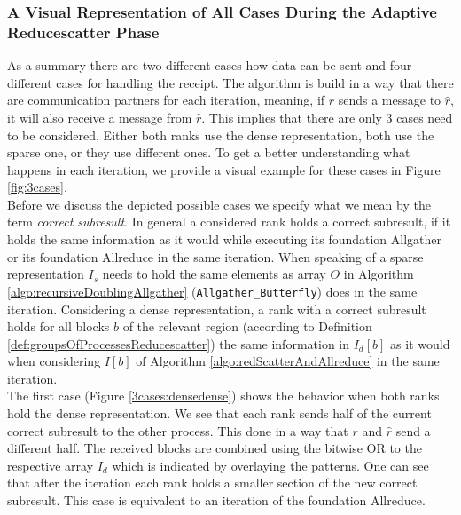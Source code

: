 \subsubsection{A Visual Representation of All Cases During the Adaptive Reducescatter Phase}
As a summary there are two different cases how data can be sent and four different cases for handling the receipt. The algorithm is build in a way that there are communication partners for each iteration, meaning, if $r$ sends a message to $\hat{r}$, it will also receive a message from $\hat{r}$. This implies that there are only 3 cases need to be considered. Either both ranks use the dense representation, both use the sparse one, or they use different ones. To get a better understanding what happens in each iteration, we provide a visual example for these cases in Figure \ref{fig:3cases}.\\
Before we discuss the depicted possible cases we specify what we mean by the term \emph{correct  subresult}. In general a considered rank holds a correct  subresult, if it holds the same information as it would while executing its foundation Allgather or its foundation Allreduce in the same iteration. When speaking of a sparse representation $I_s$ needs to hold the same elements as array $O$ in Algorithm \ref{algo:recursiveDoublingAllgather} (\texttt{All\-gath\-er\_But\-ter\-fly}) does in the same iteration. Considering a dense representation, a rank with a correct  subresult holds for all blocks $b$ of the relevant region (according to Definition \ref{def:groupsOfProcessesReducescatter}) the same information in $I_d[b]$ as it would when considering $I[b]$ of Algorithm \ref{algo:redScatterAndAllreduce} in the same iteration.\\
The first case (Figure \ref{3cases:densedense}) shows the behavior when both ranks hold the dense representation. We see that each rank sends half of the current correct  subresult to the other process. This done in a way that $r$ and $\hat{r}$ send a different half. The received blocks are combined using the bitwise OR to the respective array $I_d$ which is indicated by overlaying the patterns. One can see that after the iteration each rank holds a smaller section of the new correct  subresult. This case is equivalent to an iteration of the foundation Allreduce.
